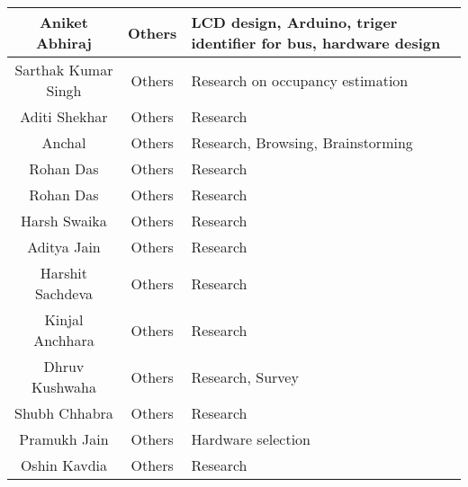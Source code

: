 \begin{center}
\begin{longtable}{ | c | c | m{6cm} | }
        \hline
        Aniket Abhiraj             & Others            & LCD design, Arduino, triger identifier for bus, hardware design        \\
        \hline
        Sarthak Kumar Singh        & Others            & Research on occupancy estimation                                        \\
        \hline
        Aditi Shekhar              & Others            & Research                                                                \\
        \hline
        Anchal                     & Others            & Research, Browsing, Brainstorming                                       \\
        \hline
        Rohan Das                  & Others            & Research                                                                \\
        \hline
        Rohan Das                  & Others            & Research                                                                \\
        \hline
        Harsh Swaika               & Others            & Research                                                                \\
        \hline
        Aditya Jain                & Others            & Research                                                                \\
        \hline
        Harshit Sachdeva           & Others            & Research                                                                \\
        \hline
        Kinjal Anchhara            & Others            & Research                                                                \\
        \hline
        Dhruv Kushwaha             & Others            & Research, Survey                                                        \\
        \hline
        Shubh Chhabra              & Others            & Research                                                                \\
        \hline
        Pramukh Jain               & Others            & Hardware selection                                                      \\
        \hline
        Oshin Kavdia               & Others            & Research                                                                \\

\end{longtable}
\end{center}
